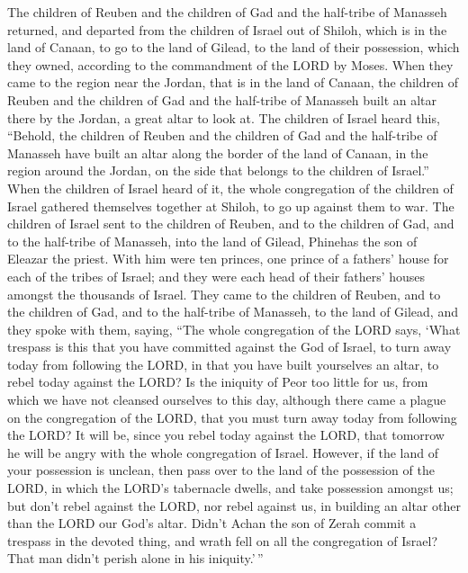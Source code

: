  The children of Reuben and the children of Gad and the
half-tribe of Manasseh returned, and departed from the children of
Israel out of Shiloh, which is in the land of Canaan, to go to the land
of Gilead, to the land of their possession, which they owned, according
to the commandment of the LORD by Moses.  When they came
to the region near the Jordan, that is in the land of Canaan, the
children of Reuben and the children of Gad and the half-tribe of
Manasseh built an altar there by the Jordan, a great altar to look at.
 The children of Israel heard this, ``Behold, the
children of Reuben and the children of Gad and the half-tribe of
Manasseh have built an altar along the border of the land of Canaan, in
the region around the Jordan, on the side that belongs to the children
of Israel.''  When the children of Israel heard of it,
the whole congregation of the children of Israel gathered themselves
together at Shiloh, to go up against them to war.  The
children of Israel sent to the children of Reuben, and to the children
of Gad, and to the half-tribe of Manasseh, into the land of Gilead,
Phinehas the son of Eleazar the priest.  With him were
ten princes, one prince of a fathers' house for each of the tribes of
Israel; and they were each head of their fathers' houses amongst the
thousands of Israel.  They came to the children of
Reuben, and to the children of Gad, and to the half-tribe of Manasseh,
to the land of Gilead, and they spoke with them, saying, 
``The whole congregation of the LORD says, `What trespass is this that
you have committed against the God of Israel, to turn away today from
following the LORD, in that you have built yourselves an altar, to rebel
today against the LORD?  Is the iniquity of Peor too
little for us, from which we have not cleansed ourselves to this day,
although there came a plague on the congregation of the LORD,
 that you must turn away today from following the LORD?
It will be, since you rebel today against the LORD, that tomorrow he
will be angry with the whole congregation of Israel. 
However, if the land of your possession is unclean, then pass over to
the land of the possession of the LORD, in which the LORD's tabernacle
dwells, and take possession amongst us; but don't rebel against the
LORD, nor rebel against us, in building an altar other than the LORD our
God's altar.  Didn't Achan the son of Zerah commit a
trespass in the devoted thing, and wrath fell on all the congregation of
Israel? That man didn't perish alone in his iniquity.'\,''

